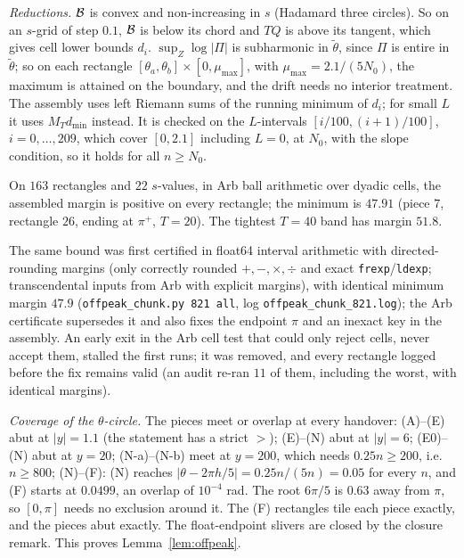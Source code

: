 \emph{Reductions.} $\mathcal B$ is convex and non-increasing in $s$ (Hadamard three circles). So on an $s$-grid of step $0.1$,
$\mathcal B$ is below its chord and $TQ$ is above its tangent, which gives cell lower bounds $d_i$. $\sup_Z\log|\Pi|$ is
subharmonic in $\tilde\theta$, since $\Pi$ is entire in $\tilde\theta$; so on each rectangle
$[\theta_a,\theta_b]\times[0,\mu_{\max}]$, with $\mu_{\max}=2.1/(5N_0)$, the maximum is attained on the boundary, and the
drift needs no interior treatment. The assembly uses left Riemann sums of the running minimum of $d_i$; for small $L$ it
uses $M_Td_{\min}$ instead. It is checked on the $L$-intervals $[i/100,(i+1)/100]$, $i=0,\dots,209$, which cover $[0,2.1]$
including $L=0$, at $N_0$, with the slope condition, so it holds for all $n\ge N_0$.

\begin{lemma}[piece (F)]\label{lem:pieceF}
On $163$ rectangles and $22$ $s$-values, in Arb ball arithmetic over dyadic cells, the assembled margin is positive on every
rectangle; the minimum is $47.91$ (piece $7$, rectangle $26$, ending at $\pi^+$, $T=20$). The tightest $T=40$ band has margin
$51.8$.
\end{lemma}
The same bound was first certified in float64 interval arithmetic with directed-rounding margins (only correctly rounded
$+,-,\times,\div$ and exact \texttt{frexp}/\texttt{ldexp}; transcendental inputs from Arb with explicit margins),
with identical minimum margin $47.9$ (\texttt{offpeak\_chunk.py 821 all}, log \texttt{offpeak\_chunk\_821.log}); the Arb
certificate supersedes it and also fixes the endpoint $\pi$ and an inexact key in the assembly. An early exit in the Arb
cell test that could only reject cells, never accept them, stalled the first runs; it was removed, and every rectangle
logged before the fix remains valid (an audit re-ran $11$ of them, including the worst, with identical margins).

\emph{Coverage of the $\theta$-circle.} The pieces meet or overlap at every handover: (A)--(E) abut at $|y|=1.1$ (the
statement has a strict $>$); (E)--(N) abut at $|y|=6$; (E0)--(N) abut at $y=20$; (N-a)--(N-b) meet at $y=200$, which needs
$0.25n\ge200$, i.e.\ $n\ge800$; (N)--(F): (N) reaches $|\theta-2\pi h/5|=0.25n/(5n)=0.05$ for every $n$, and (F) starts at
$0.0499$, an overlap of $10^{-4}$ rad. The root $6\pi/5$ is $0.63$ away from $\pi$, so $[0,\pi]$ needs no exclusion around it.
The (F) rectangles tile each piece exactly, and the pieces abut exactly. The float-endpoint slivers are closed by the
closure remark. This proves Lemma~\ref{lem:offpeak}.


